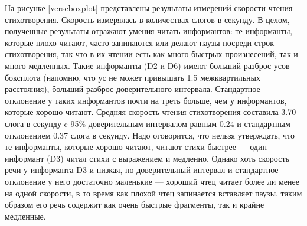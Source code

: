 \par На рисунке \ref{verseboxplot} представлены результаты измерений скорости чтения стихотворения. Скорость измерялась в количествах слогов в секунду. В целом, полученные результаты отражают умения читать информантов: те информанты, которые плохо читают, часто запинаются или делают паузы посреди строк стихотворения, так что в их чтении есть как много быстрых произнесений, так и много медленных. Такие информанты (D2 и D6) имеют больший разброс усов боксплота (напомню, что ус не может привышать 1.5 межквартильных расстояния), больший разброс доверительного интервала. Стандартное отклонение у таких информантов почти на треть больше, чем у информантов, которые хорошо читают. Средняя скорость чтения стихотворения составила 3.70 слога в секунду c 95\% доверительным интервалом равным 0.24 и стандартным отклонением 0.37 слога в секунду. Надо оговорится, что нельзя утверждать, что те информанты, которые хорошо читают, читают стихи быстрее --- один информант (D3) читал стихи с выражением и медленно. Однако хоть скорость речи у информанта D3 и низкая, но доверительный интервал и стандартное отклонение у него достаточно маленькие --- хороший чтец читает более ли менее на одной скорости, в то время как плохой чтец запинается вставляет паузы, таким образом его речь содержит как очень быстрые фрагменты, так и крайне медленные.
